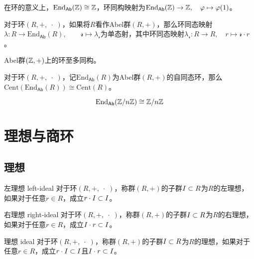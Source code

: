 \begin{proposition}
	在环的意义上，$\mathrm{End}_{\mathsf{Ab}}(\mathbb{Z})\cong\mathbb{Z}$，环同构映射为$\mathrm{End}_{\mathsf{Ab}}(\mathbb{Z})\to\mathbb{Z},\quad \varphi\mapsto \varphi(1)$。
\end{proposition}

\begin{proposition}
	对于环$(R,+,\;\cdot\;)$，如果将$R$看作Abel群$(R,+)$，那么环同态映射$\lambda:R\to \mathrm{End}_{\mathsf{Ab}}(R),\qquad \mathcal{r}\mapsto \lambda_{\mathcal{r}}$为单态射，其中环同态映射$\lambda_{\mathcal{r}}:R\to R,\quad r\mapsto \mathcal{r}\cdot r$。
\end{proposition}

\begin{proposition}
	Abel群$(\mathbb{Z},+)$上的环至多同构。
\end{proposition}

\begin{proposition}
	对于环$(R,+,\;\cdot\;)$，记$\mathrm{End}_{\mathsf{Ab}}(R)$为Abel群$(R,+)$的自同态环，那么$\mathrm{Cent}(\mathrm{End}_{\mathsf{Ab}}(R))\cong \mathrm{Cent}(R)$。
\end{proposition}

\begin{proposition}
	$$
	\mathrm{End}_{\mathsf{Ab}}(\mathbb{Z}/n\mathbb{Z})\cong \mathbb{Z}/n\mathbb{Z}
	$$
\end{proposition}

\section{理想与商环}

\subsection{理想}

\begin{definition}{左理想 left-ideal}
	对于环$(R,+,\;\cdot\;)$，称群$(R,+)$的子群$I\subset R$为$R$的左理想，如果对于任意$r\in R$，成立$r\cdot I\subset I$。
\end{definition}

\begin{definition}{右理想 right-ideal}
	对于环$(R,+,\;\cdot\;)$，称群$(R,+)$的子群$I\subset R$为$R$的右理想，如果对于任意$r\in R$，成立$I\cdot r\subset I$。
\end{definition}

\begin{definition}{理想 ideal}
	对于环$(R,+,\;\cdot\;)$，称群$(R,+)$的子群$I\subset R$为$R$的理想，如果对于任意$r\in R$，成立$r\cdot I\subset I$且$I\cdot r\subset I$。
\end{definition}


